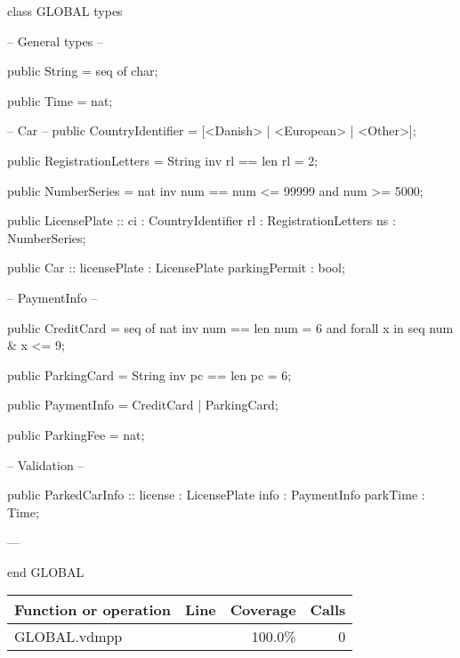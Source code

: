 \begin{vdmpp}[breaklines=true]
class GLOBAL
types

-- General types --

public String = seq of char;

public Time = nat;

-- Car  --
public CountryIdentifier = [<Danish> | <European> | <Other>];

public RegistrationLetters = String
inv rl == len rl = 2;

public NumberSeries = nat
inv num == num <= 99999 and num >= 5000;

public LicensePlate :: ci : CountryIdentifier
                  rl : RegistrationLetters
                  ns : NumberSeries; 
                  
public Car :: licensePlate : LicensePlate
       parkingPermit : bool;                  

-- PaymentInfo --

public CreditCard = seq of nat
inv num == len num = 6 and forall x in seq num & x <= 9;

public ParkingCard = String
inv pc == len pc = 6;
  
public PaymentInfo = CreditCard | ParkingCard;

public ParkingFee = nat;

-- Validation --

public ParkedCarInfo ::
 license  : LicensePlate
 info    : PaymentInfo
 parkTime : Time; 

---
               
end GLOBAL
\end{vdmpp}
\bigskip
\begin{longtable}{|l|r|r|r|}
\hline
Function or operation & Line & Coverage & Calls \\
\hline
\hline
\hline
GLOBAL.vdmpp & & 100.0\% & 0 \\
\hline
\end{longtable}


